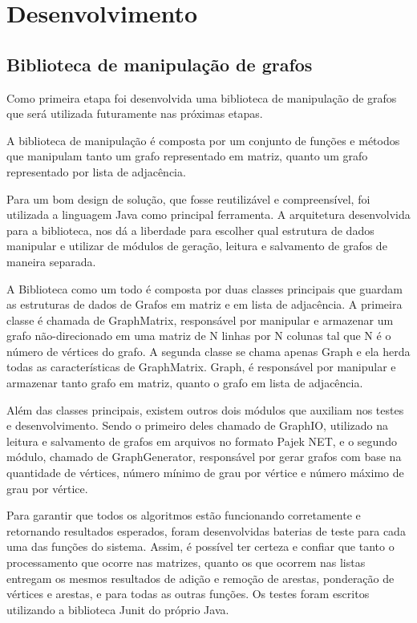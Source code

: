 \chapter{Desenvolvimento}
\label{metodo}

\section{Biblioteca de manipulação de grafos}
Como primeira etapa foi desenvolvida uma biblioteca de manipulação de grafos que será utilizada futuramente nas próximas
etapas.

A biblioteca de manipulação é composta por um conjunto de funções e métodos que manipulam tanto um grafo representado
em matriz, quanto um grafo representado por lista de adjacência.

Para um bom design de solução, que fosse reutilizável e compreensível, foi utilizada a linguagem Java como principal
ferramenta. A arquitetura desenvolvida para a biblioteca, nos dá a liberdade para escolher qual estrutura de dados
manipular e utilizar de módulos de geração, leitura e salvamento de grafos de maneira separada.

A Biblioteca como um todo é composta por duas classes principais que guardam as estruturas de dados de Grafos em matriz
e em lista de adjacência. A primeira classe é chamada de GraphMatrix, responsável por manipular e armazenar um grafo
não-direcionado em uma matriz de N linhas por N colunas tal que N é o número de vértices do grafo. A segunda classe
se chama apenas Graph e ela herda todas as características de GraphMatrix. Graph, é responsável por manipular e
armazenar tanto grafo em matriz, quanto o grafo em lista de adjacência.

Além das classes principais, existem outros dois módulos que auxiliam nos testes e desenvolvimento. Sendo o primeiro
deles chamado de GraphIO, utilizado na leitura e salvamento de grafos em arquivos no formato Pajek NET, e o segundo
módulo, chamado de GraphGenerator, responsável por gerar grafos com base na quantidade de vértices, número mínimo de
grau por vértice e número máximo de grau por vértice.

Para garantir que todos os algoritmos estão funcionando corretamente e retornando resultados esperados, foram
desenvolvidas baterias de teste para cada uma das funções do sistema. Assim, é possível ter certeza e confiar que
tanto o processamento que ocorre nas matrizes, quanto os que ocorrem nas listas entregam os mesmos resultados de
adição e remoção de arestas, ponderação de vértices e arestas, e para todas as outras funções. Os testes foram
escritos utilizando a biblioteca Junit do próprio Java.

